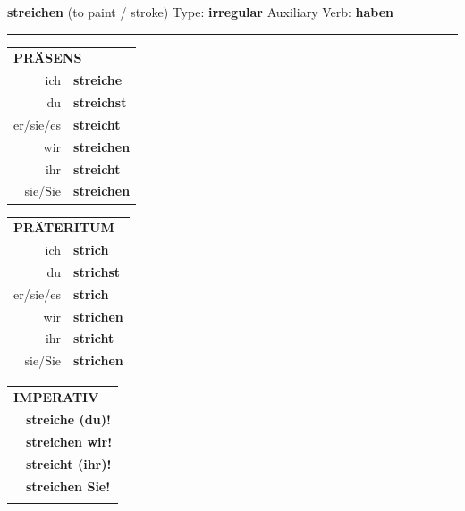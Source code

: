 \documentclass[10pt,a4paper]{revtex4-2}
\begin{document}
\begin{verbbox}
    {\Large \bf streichen} (to paint / stroke) \hfill Type: \textbf{irregular} \hfill Auxiliary Verb: \textbf{haben} 
    
     \vspace{5pt}

    \hrule
    
    \vspace{5pt}

  \begin{tabular}{rl}
     \multicolumn{2}{l}{\textbf{PRÄSENS} }\\
    ich & \textbf{streiche}\\
    du & \textbf{streichst}\\
    er/sie/es & \textbf{streicht}\\
    wir & \textbf{streichen}\\
    ihr & \textbf{streicht}\\
    sie/Sie & \textbf{streichen}\\
  \end{tabular}
  \hfill
  \begin{tabular}{rl}
    \multicolumn{2}{l}{\textbf{PRÄTERITUM} }\\
    ich & \textbf{strich}\\
    du & \textbf{strichst}\\
    er/sie/es & \textbf{strich}\\
    wir & \textbf{strichen}\\
    ihr & \textbf{stricht}\\
    sie/Sie & \textbf{strichen}\\
  \end{tabular}
  \hfill
  \begin{tabular}{rl}
     \multicolumn{2}{l}{\textbf{IMPERATIV} }\\
   & \textbf{streiche (du)!}\\
   & \textbf{streichen wir!}\\
   & \textbf{streicht (ihr)!}\\
   & \textbf{streichen Sie!}\\
   & \vspace{10pt}
  \end{tabular}

 \vspace{10pt}


\end{verbbox}
\end{document}
